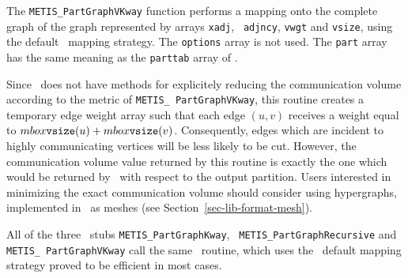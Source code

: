 \begin{itemize}
\progdes

The {\tt METIS\_PartGraphVKway} function performs a mapping onto the
complete graph of the graph represented by arrays {\tt xadj}, {\tt
adjncy}, {\tt vwgt} and {\tt vsize}, using the default
\scotch\ mapping strategy. The {\tt options} array is not used. The
{\tt part} array has the same meaning as the {\tt parttab} array of
\scotch.

Since \scotch\ does not have methods for explicitely reducing the
communication volume according to the metric of {\tt METIS\_\lbo
Part\lbo Graph\lbo VKway}, this routine creates a temporary
edge weight array such that each edge $(u,v)$ receives a weight
equal to $mbox{\tt vsize}(u) + mbox{\tt vsize}(v)$. Consequently,
edges which are incident to highly communicating vertices will be
less likely to be cut. However, the communication volume value
returned by this routine is exactly the one which would be returned
by \metis\ with respect to the output partition. Users interested
in minimizing the exact communication volume should consider using
hypergraphs, implemented in \scotch\ as
meshes (see Section~\ref{sec-lib-format-mesh}).

All of the three \metis\ stubs
{\tt METIS\_\lbo Part\lbo Graph\lbo Kway}, {\tt
METIS\_\lbo Part\lbo Graph\lbo Recursive} and {\tt METIS\_\lbo
Part\lbo Graph\lbo VKway} call the same \scotch\ routine, which uses
the \scotch\ default mapping strategy proved to be efficient in most
cases.
\end{itemize}
